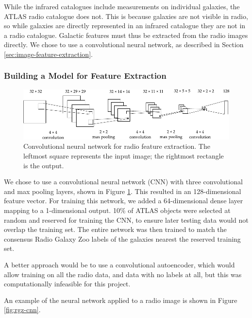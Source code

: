     While the infrared catalogues include measurements on individual galaxies,
    the ATLAS radio catalogue does not. This is because galaxies are not
    visible in radio, so while galaxies are directly represented in an infrared
    catalogue they are not in a radio catalogue. Galactic features must thus be
    extracted from the radio images directly. We chose to use a convolutional
    neural network, as described in Section \ref{sec:image-feature-extraction}.

    \subsubsection{Building a Model for Feature Extraction}
    \label{sec:feature-extraction-model}

      \begin{figure}[!ht]
         \centering
         \includegraphics[width=\textwidth]{images/cnn_new.pdf}
         \caption{Convolutional neural network for radio feature extraction. The
           leftmost square represents the input image; the rightmost rectangle
           is the output.}
         \label{fig:radio-cnn}
       \end{figure}

      We chose to use a convolutional neural network (CNN) with three
      convolutional and max pooling layers, shown in Figure \ref{fig:radio-cnn}.
      This resulted in an 128-dimensional feature vector. For training this
      network, we added a 64-dimensional dense layer mapping to a 1-dimensional
      output. 10\% of ATLAS objects were selected at random and reserved for
      training the CNN, to ensure later testing data would not overlap the
      training set. The entire network was then trained to match the consensus
      Radio Galaxy Zoo labels of the galaxies nearest the reserved training set.

      A better approach would be to use a convolutional autoencoder, which would
      allow training on all the radio data, and data with no labels at all, but
      this was computationally infeasible for this project.

      An example of the neural network applied to a radio image is shown in
      Figure \ref{fig:rgz-cnn}.

